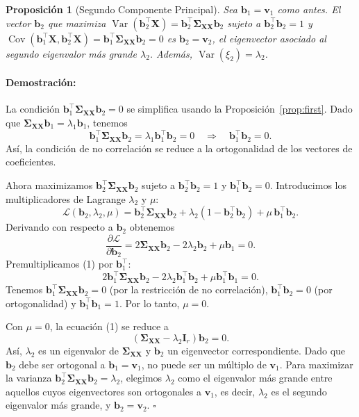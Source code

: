\documentclass[11pt]{article}
\theoremstyle{plain}
\newtheorem{proposition}[theorem]{Proposición}
\newenvironment{proof}{\paragraph{Demostración:}}{\hfill$\square$}
\newcommand{\X}{\mathbf{X}}
\newcommand{\bff}{\mathbf{b}}
\newcommand{\bfv}{\mathbf{v}}
\newcommand{\bfI}{\mathbf{I}}
\newcommand{\bfSigma}{\boldsymbol{\Sigma}}
\newcommand{\Var}{\operatorname{Var}}
\newcommand{\Cov}{\operatorname{Cov}}
\begin{document}
\begin{proposition}[Segundo Componente Principal]
\label{prop:second}
Sea \(\bff_1 = \bfv_1\) como antes. El vector \(\bff_2\) que maximiza \(\Var(\bff_2^\top \X) = \bff_2^\top \bfSigma_{\X\X} \bff_2\) sujeto a \(\bff_2^\top \bff_2 = 1\) y \(\Cov(\bff_1^\top \X, \bff_2^\top \X) = \bff_1^\top \bfSigma_{\X\X} \bff_2 = 0\) es \(\bff_2 = \bfv_2\), el eigenvector asociado al segundo eigenvalor más grande \(\lambda_2\). Además, \(\Var(\xi_2) = \lambda_2\).
\end{proposition}

\begin{proof}
La condición \(\bff_1^\top \bfSigma_{\X\X} \bff_2 = 0\) se simplifica usando la Proposición~\ref{prop:first}. Dado que \(\bfSigma_{\X\X} \bff_1 = \lambda_1 \bff_1\), tenemos
\[
\bff_1^\top \bfSigma_{\X\X} \bff_2 = \lambda_1 \bff_1^\top \bff_2 = 0 \quad \Longrightarrow \quad \bff_1^\top \bff_2 = 0.
\]
Así, la condición de no correlación se reduce a la ortogonalidad de los vectores de coeficientes.

Ahora maximizamos \(\bff_2^\top \bfSigma_{\X\X} \bff_2\) sujeto a \(\bff_2^\top \bff_2 = 1\) y \(\bff_1^\top \bff_2 = 0\). Introducimos los multiplicadores de Lagrange \(\lambda_2\) y \(\mu\):
\[
\mathcal{L}(\bff_2, \lambda_2, \mu) = \bff_2^\top \bfSigma_{\X\X} \bff_2 + \lambda_2(1 - \bff_2^\top \bff_2) + \mu \, \bff_1^\top \bff_2.
\]
Derivando con respecto a \(\bff_2\) obtenemos
\[
\frac{\partial \mathcal{L}}{\partial \bff_2} = 2\bfSigma_{\X\X} \bff_2 - 2\lambda_2 \bff_2 + \mu \bff_1 = 0.
\tag{1}
\]
Premultiplicamos (1) por \(\bff_1^\top\):
\[
2\bff_1^\top \bfSigma_{\X\X} \bff_2 - 2\lambda_2 \bff_1^\top \bff_2 + \mu \bff_1^\top \bff_1 = 0.
\]
Tenemos \(\bff_1^\top \bfSigma_{\X\X} \bff_2 = 0\) (por la restricción de no correlación), \(\bff_1^\top \bff_2 = 0\) (por ortogonalidad) y \(\bff_1^\top \bff_1 = 1\). Por lo tanto, \(\mu = 0\).

Con \(\mu = 0\), la ecuación (1) se reduce a
\[
(\bfSigma_{\X\X} - \lambda_2 \bfI_r) \bff_2 = 0.
\]
Así, \(\lambda_2\) es un eigenvalor de \(\bfSigma_{\X\X}\) y \(\bff_2\) un eigenvector correspondiente. Dado que \(\bff_2\) debe ser ortogonal a \(\bff_1 = \bfv_1\), no puede ser un múltiplo de \(\bfv_1\). Para maximizar la varianza \(\bff_2^\top \bfSigma_{\X\X} \bff_2 = \lambda_2\), elegimos \(\lambda_2\) como el eigenvalor más grande entre aquellos cuyos eigenvectores son ortogonales a \(\bfv_1\), es decir, \(\lambda_2\) es el segundo eigenvalor más grande, y \(\bff_2 = \bfv_2\).
\end{proof}
\end{document}
